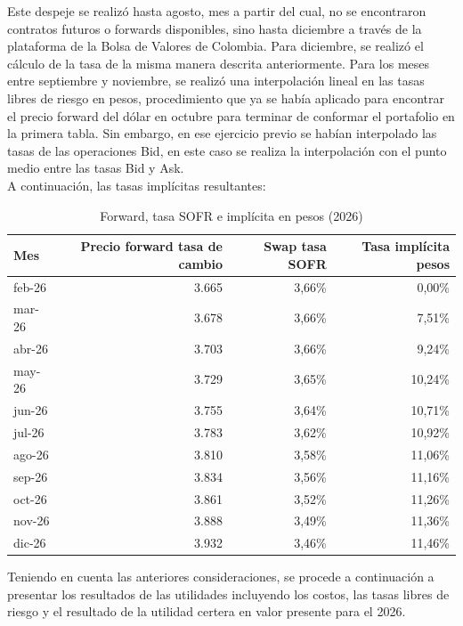 \documentclass{article}
\theoremstyle{remark}
\theoremstyle{definition}
\begin{document}
Este despeje se realizó hasta agosto, mes a partir del cual, no se encontraron contratos futuros o forwards disponibles, sino hasta diciembre a través de la plataforma de la Bolsa de Valores de Colombia. Para diciembre, se realizó el cálculo de la tasa de la misma manera descrita anteriormente. Para los meses entre septiembre y noviembre, se realizó una interpolación lineal en las tasas libres de riesgo en pesos, procedimiento que ya se había aplicado para encontrar el precio forward del dólar en octubre para terminar de conformar el portafolio en la primera tabla. Sin embargo, en ese ejercicio previo se habían interpolado las tasas de las operaciones Bid, en este caso se realiza la interpolación con el punto medio entre las tasas Bid y Ask.\\

A continuación, las tasas implícitas resultantes:\\

\begin{table}[H]
\centering
\caption{Forward, tasa SOFR e implícita en pesos (2026)}
\scriptsize
\renewcommand{\arraystretch}{1.2}

\begin{tabular}{l|r r|r}
\toprule
\textbf{Mes} &
\textbf{Precio forward tasa de cambio} &
\textbf{Swap tasa SOFR} &
\textbf{Tasa implícita pesos} \\
\midrule

feb-26 & 3.665 & 3,66\% & 0,00\% \\
mar-26 & 3.678 & 3,66\% & 7,51\% \\
abr-26 & 3.703 & 3,66\% & 9,24\% \\
may-26 & 3.729 & 3,65\% & 10,24\% \\
jun-26 & 3.755 & 3,64\% & 10,71\% \\
jul-26 & 3.783 & 3,62\% & 10,92\% \\
ago-26 & 3.810 & 3,58\% & 11,06\% \\
sep-26 & 3.834 & 3,56\% & 11,16\% \\
oct-26 & 3.861 & 3,52\% & 11,26\% \\
nov-26 & 3.888 & 3,49\% & 11,36\% \\
dic-26 & 3.932 & 3,46\% & 11,46\% \\

\bottomrule
\end{tabular}
\end{table}



Teniendo en cuenta las anteriores consideraciones, se procede a continuación a presentar los resultados de las utilidades incluyendo los costos, las tasas libres de riesgo y el resultado de la utilidad certera en valor presente para el 2026.
\end{document}
